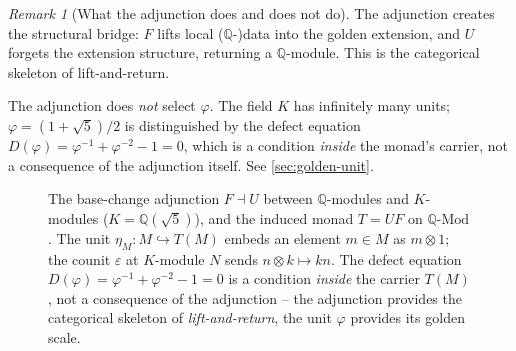 \documentclass[11pt,a4paper]{article}
\theoremstyle{plain}
\theoremstyle{definition}
\theoremstyle{remark}
\newtheorem{remark}[theorem]{Remark}
\numberwithin{equation}{section}
\providecommand{\Q}{\mathbb{Q}}
\providecommand{\vp}{\varphi}
\providecommand{\id}{\mathrm{id}}
\begin{document}
\begin{remark}[What the adjunction does and does not do]
\label{rmk:adjunction-scope}
The adjunction creates the structural bridge: $F$ lifts local
($\Q$-)data into the golden extension, and $U$ forgets the
extension structure, returning a $\Q$-module.  This is the
categorical skeleton of lift-and-return.

The adjunction does \emph{not} select $\vp$.  The field $K$ has
infinitely many units; $\vp = (1 + \sqrt{5})/2$ is distinguished
by the defect equation $D(\vp) = \vp^{-1} + \vp^{-2} - 1 = 0$,
which is a condition \emph{inside} the monad's carrier, not a
consequence of the adjunction itself.  See \cref{sec:golden-unit}.
\end{remark}

\begin{figure}[h]
\centering
{}
\caption{The base-change adjunction $F \dashv U$ between $\Q$-modules
and $K$-modules ($K = \Q(\sqrt{5})$), and the induced monad
$T = U F$ on $\Q\text{-Mod}$.  The unit $\eta_M: M \hookrightarrow
T(M)$ embeds an element $m \in M$ as $m \otimes 1$; the counit
$\varepsilon$ at $K$-module $N$ sends $n \otimes k \mapsto kn$.
The defect equation $D(\vp) = \vp^{-1} + \vp^{-2} - 1 = 0$ is a
condition \emph{inside} the carrier $T(M)$, not a consequence of
the adjunction -- the adjunction provides the categorical skeleton
of \emph{lift-and-return}, the unit $\vp$ provides its golden
scale.}
\label{fig:monad-adjunction}
\end{figure}
\end{document}
